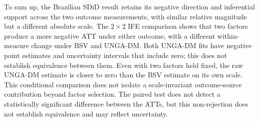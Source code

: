 \documentclass[referee,pdflatex,sn-basic]{sn-jnl}
\theoremstyle{thmstylethree}
\begin{document}
To sum up, the Brazilian SDiD result retains its negative direction and inferential support across the two outcome measurements, with similar relative magnitude but a different absolute scale. The \(2\times2\) IFE comparison shows that two factors produce a more negative ATT under either outcome, with a different within-measure change under BSV and UNGA-DM. Both UNGA-DM fits have negative point estimates and uncertainty intervals that include zero; this does not establish equivalence between them. Even with two factors held fixed, the raw UNGA-DM estimate is closer to zero than the BSV estimate on its own scale. This conditional comparison does not isolate a scale-invariant outcome-source contribution beyond factor selection. The paired test does not detect a statistically significant difference between the ATTs, but this non-rejection does not establish equivalence and may reflect uncertainty.
\end{document}
